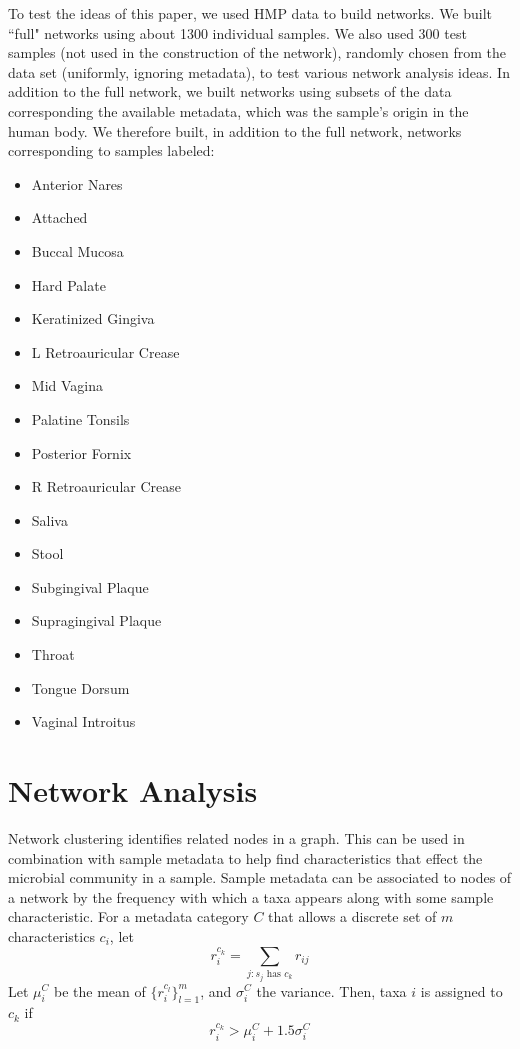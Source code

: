 \documentclass[10pt]{article}
\theoremstyle{definition}
\numberwithin{theorem}{section}
\numberwithin{definition}{section}
\numberwithin{lemma}{section}
\numberwithin{corollary}{section}
\numberwithin{clm}{section}
\numberwithin{rmk}{section}
\begin{document}
To test the ideas of this paper, we used HMP data to build networks. We built ``full" networks using about 1300 individual samples. We also used 300 test samples (not used in the construction of the network), randomly chosen from the data set (uniformly, ignoring metadata), to test various network analysis ideas. In addition to the full network, we built networks using subsets of the data corresponding the available metadata, which was the sample's origin in the human body. We therefore built, in addition to the full network, networks corresponding to samples labeled:
\begin{multicols}{2}
\begin{itemize}
	\item Anterior Nares
	\item Attached
	\item Buccal Mucosa
	\item Hard Palate
	\item Keratinized Gingiva
	\item L Retroauricular Crease
	\item Mid Vagina
	\item Palatine Tonsils
	\item Posterior Fornix
	\item R Retroauricular Crease
	\item Saliva
	\item Stool
	\item Subgingival Plaque
	\item Supragingival Plaque
	\item Throat
	\item Tongue Dorsum
	\item Vaginal Introitus
\end{itemize}
\end{multicols}
\section{Network Analysis}
Network clustering identifies related nodes in a graph. This can be used in combination with sample metadata to help find characteristics that effect the microbial community in a sample. Sample metadata can be associated to nodes of a network by the frequency with which a taxa appears along with some sample characteristic. For a metadata category  $C$ that allows a discrete set of $m$ characteristics $c_i$, let
\[
r_i^{c_k} = \sum_{j:s_j \text{ has } c_k} r_{ij}
\]
Let $\mu_i^C$ be the mean of $\{r_i^{c_l}\}_{l=1}^m$, and $\sigma_i^C$ the variance. Then, taxa $i$ is assigned to $c_k$ if
\[
r_i^{c_k} > \mu_i^C + 1.5\sigma_i^C
\]
\end{document}
